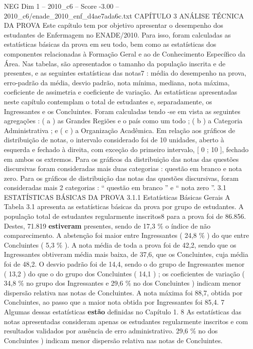 \begin{textsample}{NEG Dim 1 – 2010\_c6 – Score -3.00 – 2010\_c6/enade\_2010\_enf\_d4ae7ada6c.txt}  \label{ex:f1_neg_273}
CAPÍTULO 3 ANÁLISE TÉCNICA DA PROVA Este capítulo tem por objetivo apresentar o desempenho dos estudantes de Enfermagem no ENADE/2010.
Para isso, foram calculadas as estatísticas básicas da prova em seu todo, bem como as estatísticas dos componentes relacionadas à Formação Geral e ao de Conhecimento Específico da Área.
Nas tabelas, são apresentados o tamanho da população inscrita e de presentes, e as seguintes estatísticas das notas7 : média do desempenho na prova, erro-padrão da média, desvio padrão, nota mínima, mediana, nota máxima, coeficiente de assimetria e coeficiente de variação.
As estatísticas apresentadas neste capítulo contemplam o total de estudantes e, separadamente, os Ingressantes e os Concluintes.
Foram calculadas tendo -se em vista as seguintes agregações : ( a ) as Grandes Regiões e o país como um todo ; ( b ) a Categoria Administrativa ; e ( c ) a Organização Acadêmica.
Em relação aos gráficos de distribuição de notas, o intervalo considerado foi de 10 unidades, aberto à esquerda e fechado à direita, com exceção do primeiro intervalo, [ 0 ; 10 ], fechado em ambos os extremos.
Para os gráficos da distribuição das notas das questões discursivas foram consideradas mais duas categorias : questão em branco e nota zero.
Para os gráficos de distribuição das notas das questões discursivas, foram consideradas mais 2 categorias : “ questão em branco ” e “ nota zero ”. 3.1 ESTATÍSTICAS BÁSICAS DA PROVA 3.1.1 Estatísticas Básicas Gerais A Tabela 3.1 apresenta as estatísticas básicas da prova por grupo de estudantes.
A população total de estudantes regularmente inscritos8 para a prova foi de 86.856.
Destes, 71.819 \textbf{estiveram} presentes, sendo de 17,3 \% o índice de não comparecimento.
A abstenção foi maior entre Ingressantes ( 24,8 \% ) do que entre Concluintes ( 5,3 \% ).
A nota média de toda a prova foi de 42,2, sendo que os Ingressantes obtiveram média mais baixa, de 37,6, que os Concluintes, cuja média foi de 48,2.
O desvio padrão foi de 14,4, sendo o do grupo de Ingressantes menor ( 13,2 ) do que o do grupo dos Concluintes ( 14,1 ) ; os coeficientes de variação ( 34,8 \% no grupo dos Ingressantes e 29,6 \% no dos Concluintes ) indicam menor dispersão relativa nas notas de Concluintes.
A nota máxima foi 88,7, obtida por Concluintes, ao passo que a maior nota obtida por Ingressantes foi 85,4. 7 Algumas dessas estatísticas \textbf{estão} definidas no Capítulo 1. 8 As estatísticas das notas apresentadas consideram apenas os estudantes regularmente inscritos e com resultados validados por ausência de erro administrativo. 29,6 \% no dos Concluintes ) indicam menor dispersão relativa nas notas de Concluintes.

\end{textsample}
